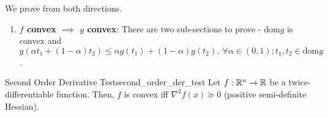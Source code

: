 \begin{proof*}
	We prove from both directions.
	\begin{enumerate}[label=(\roman*)]
		\item \textbf{$f$ convex $\implies$ $g$ convex}: There are two sub-sections to prove - $\mathrm{dom}g$ is convex and $g(\alpha t_1 + (1-\alpha)t_2)\le \alpha g(t_1) + (1-\alpha)g(t_2), \ \forall \alpha\in(0,1); t_1, t_2\in \mathrm{dom}g$.	
	\end{enumerate} 	
\end{proof*} 

\begin{proposition}{Second Order Derivative Test}{second_order_der_test}
	Let $f:\mathbb{R}^n\to\mathbb{R}$ be a twice-differentiable function. Then, $f$ is convex iff $\nabla^2 f(x)\succeq	0$ (positive semi-definite Hessian).
\end{proposition} 

